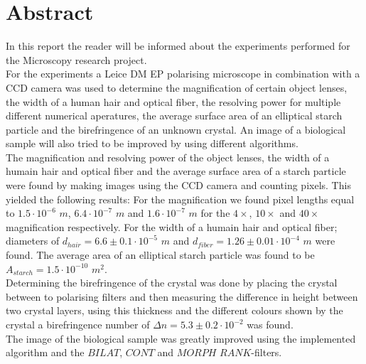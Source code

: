 \section*{Abstract}
In this report the reader will be informed about the experiments performed for the Microscopy research project.\\
For the experiments a Leice DM EP polarising microscope in combination with a CCD camera was used to determine the magnification of certain object lenses, the width of a human hair and optical fiber, the resolving power for multiple different numerical aperatures, the average surface area of an elliptical starch particle and the birefringence of an unknown crystal. An image of a biological sample will also tried to be improved by using different algorithms.\\
The magnification and resolving power of the object lenses, the width of a humain hair and optical fiber and the average surface area of a starch particle were found by making images using the CCD camera and counting pixels. This yielded the following results: For the magnification we found  pixel lengths equal to $1.5\cdot10^{-6}$ $m$, $6.4\cdot10^{-7}$ $m$ and $1.6\cdot10^{-7}$ $m$ for the $4\times$, $10\times$ and $40\times$ magnification respectively. For the width of a humain hair and optical fiber; diameters of $d_{hair}=6.6\pm0.1\cdot10^{-5}$ $m$ and $d_{fiber} = 1.26\pm0.01\cdot10^{-4}$ $m$ were found. The average area of an elliptical starch particle was found to be $A_{starch}=1.5\cdot10^{-10}$ $m^2$.\\
Determining the birefringence of the crystal was done by placing the crystal between to polarising filters and then measuring the difference in height between two crystal layers, using this thickness and the different colours shown by the crystal a birefringence number of $\Delta n = 5.3\pm0.2\cdot10^{-2}$ was found.\\
The image of the biological sample was greatly improved using the implemented algorithm and the $BILAT$, $CONT$ and $MORPH$ $RANK$-filters.\\